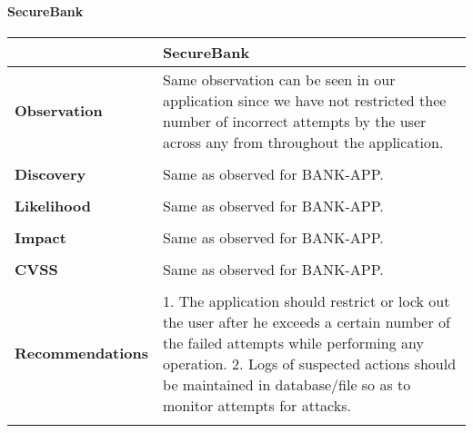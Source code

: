 \paragraph{SecureBank} \mbox{}
\begin{longtable*}{p{.20\textwidth} | p{.80\textwidth}}
    \hline
    & \textbf{SecureBank} \\
    \hline
    \textbf{Observation} &
       Same observation can be seen in our application since we have not restricted thee number of incorrect attempts by the user across any from throughout the application.
    \\\\
    \textbf{Discovery} &
	    Same as observed for BANK-APP.
    \\\\
    \textbf{Likelihood} &
     Same as observed for BANK-APP.
    \\\\
    \textbf{Impact} &
      Same as observed for BANK-APP.
    \\\\
    \textbf{CVSS} &
     Same as observed for BANK-APP.
    \\\\
    \textbf{Recommendations} &
     1. The application should restrict or lock out the user after he exceeds a certain number of the failed attempts while performing any operation. 
     2. Logs of suspected actions should be maintained in database/file so as to monitor attempts for attacks.
     \\
    \\
    \hline
\end{longtable*}
\clearpage